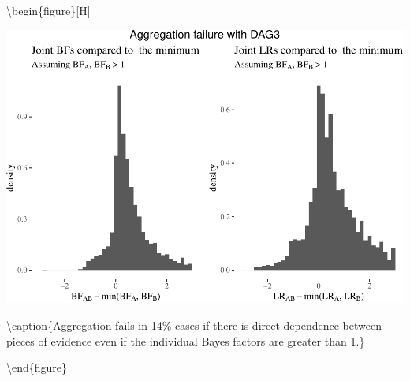 \documentclass[
  10pt,
  dvipsnames,enabledeprecatedfontcommands]{scrartcl}
\begin{document}
\textbackslash begin\{figure\}{[}H{]}

\begin{center}\includegraphics[width=1\linewidth]{conjunction-appendix13_files/figure-latex/aggregationFails-1} \end{center}

\textbackslash caption\{Aggregation fails in 14\% cases if there is
direct dependence between pieces of evidence even if the individual
Bayes factors are greater than 1.\}

\label{fig:aggregationFails}

\textbackslash end\{figure\}
\end{document}
